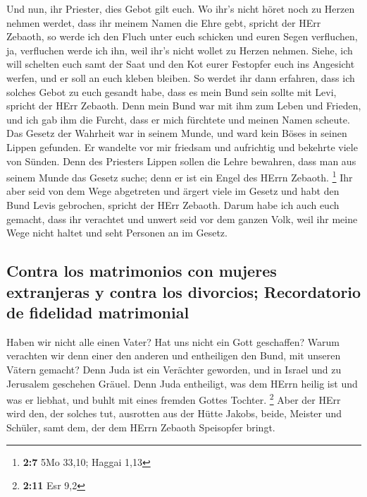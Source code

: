  Und nun, ihr Priester, dies Gebot gilt euch.
 Wo ihr's nicht höret noch zu Herzen nehmen werdet, dass
ihr meinem Namen die Ehre gebt, spricht der HErr Zebaoth, so werde ich
den Fluch unter euch schicken und euren Segen verfluchen, ja, verfluchen
werde ich ihn, weil ihr's nicht wollet zu Herzen nehmen. 
Siehe, ich will schelten euch samt der Saat und den Kot eurer Festopfer
euch ins Angesicht werfen, und er soll an euch kleben bleiben.
 So werdet ihr dann erfahren, dass ich solches Gebot zu
euch gesandt habe, dass es mein Bund sein sollte mit Levi, spricht der
HErr Zebaoth.  Denn mein Bund war mit ihm zum Leben und
Frieden, und ich gab ihm die Furcht, dass er mich fürchtete und meinen
Namen scheute.  Das Gesetz der Wahrheit war in seinem
Munde, und ward kein Böses in seinen Lippen gefunden. Er wandelte vor
mir friedsam und aufrichtig und bekehrte viele von Sünden.
 Denn des Priesters Lippen sollen die Lehre bewahren, dass
man aus seinem Munde das Gesetz suche; denn er ist ein Engel des HErrn
Zebaoth. \footnote{\textbf{2:7} 5Mo 33,10; Haggai 1,13} 
Ihr aber seid von dem Wege abgetreten und ärgert viele im Gesetz und
habt den Bund Levis gebrochen, spricht der HErr Zebaoth. 
Darum habe ich auch euch gemacht, dass ihr verachtet und unwert seid vor
dem ganzen Volk, weil ihr meine Wege nicht haltet und seht Personen an
im Gesetz.

\hypertarget{contra-los-matrimonios-con-mujeres-extranjeras-y-contra-los-divorcios-recordatorio-de-fidelidad-matrimonial}{%
\subsection{Contra los matrimonios con mujeres extranjeras y contra los
divorcios; Recordatorio de fidelidad
matrimonial}\label{contra-los-matrimonios-con-mujeres-extranjeras-y-contra-los-divorcios-recordatorio-de-fidelidad-matrimonial}}

 Haben wir nicht alle einen Vater? Hat uns nicht ein Gott
geschaffen? Warum verachten wir denn einer den anderen und entheiligen
den Bund, mit unseren Vätern gemacht?  Denn Juda ist ein
Verächter geworden, und in Israel und zu Jerusalem geschehen Gräuel.
Denn Juda entheiligt, was dem HErrn heilig ist und was er liebhat, und
buhlt mit eines fremden Gottes Tochter. \footnote{\textbf{2:11} Esr 9,2}
 Aber der HErr wird den, der solches tut, ausrotten aus
der Hütte Jakobs, beide, Meister und Schüler, samt dem, der dem HErrn
Zebaoth Speisopfer bringt.

